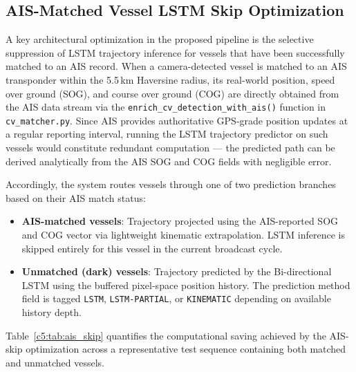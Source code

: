 \subsection{AIS-Matched Vessel LSTM Skip Optimization}

A key architectural optimization in the proposed pipeline is the selective suppression of LSTM trajectory inference for vessels that have been successfully matched to an AIS record. When a camera-detected vessel is matched to an AIS transponder within the 5.5\,km Haversine radius, its real-world position, speed over ground (SOG), and course over ground (COG) are directly obtained from the AIS data stream via the \texttt{enrich\_cv\_detection\_with\_ais()} function in \texttt{cv\_matcher.py}. Since AIS provides authoritative GPS-grade position updates at a regular reporting interval, running the LSTM trajectory predictor on such vessels would constitute redundant computation — the predicted path can be derived analytically from the AIS SOG and COG fields with negligible error.

Accordingly, the system routes vessels through one of two prediction branches based on their AIS match status:

\begin{itemize}
  \item \textbf{AIS-matched vessels}: Trajectory projected using the AIS-reported SOG and COG vector via lightweight kinematic extrapolation. LSTM inference is skipped entirely for this vessel in the current broadcast cycle.
  \item \textbf{Unmatched (dark) vessels}: Trajectory predicted by the Bi-directional LSTM using the buffered pixel-space position history. The prediction method field is tagged \texttt{LSTM}, \texttt{LSTM-PARTIAL}, or \texttt{KINEMATIC} depending on available history depth.
\end{itemize}

Table~\ref{c5:tab:ais_skip} quantifies the computational saving achieved by the AIS-skip optimization across a representative test sequence containing both matched and unmatched vessels.

